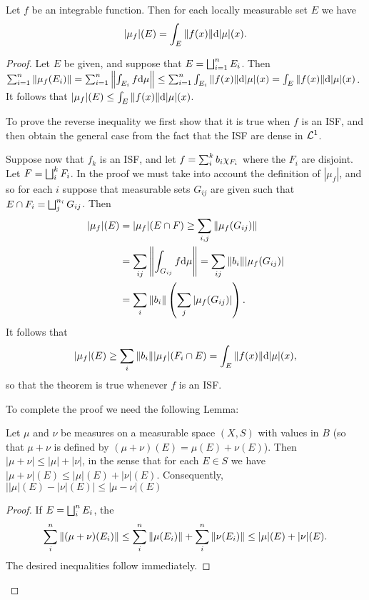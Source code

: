 \begin{proposition}
Let $f$ be an integrable function. Then for each locally measurable set $E$ we have $$|\mu_f|(E)=\int_E\norm{f(x)}\dd|\mu|(x).$$
\end{proposition}

\begin{proof}
Let $E$ be given, and suppose that $E=\bigsqcup_{i=1}^nE_i$. Then $\sum_{i=1}^n\norm{\mu_f(E_i)} = \sum_{i=1}^n\norm{\int_{E_i}f\dd\mu} \leq \sum_{i=1}^n\int_{E_i}\norm{f(x)}\dd|\mu|(x) = \allowbreak \int_E\norm{f(x)}\dd|\mu|(x)$. It follows that $|\mu_f|(E)\leq\int_E\norm{f(x)}\dd|\mu|(x)$.

To prove the reverse inequality we first show that it is true when $f$ is an ISF, and then obtain the general case from the fact that the ISF are dense in ${\cal L}^1$.

Suppose now that $f_k$ is an ISF, and let $f=\sum_i^kb_i\chi_{F_i}$ where the $F_i$ are disjoint. Let $F=\bigsqcup_i^kF_i$. In the proof we must take into account the definition of $|\mu_f|$, and so for each $i$ suppose that measurable sets $G_{ij}$ are given such that $E\cap F_i=\bigsqcup_j^{n_i}G_{ij}$. Then
\begin{align*}
    |\mu_f|(E)&=|\mu_f|(E\cap F)\geq\sum_{i,j}\norm{\mu_f(G_{ij})}\\
    &=\sum_{ij}\norm{\int_{G_{ij}}f\dd\mu}=\sum_{ij}\norm{b_i}|\mu_f(G_{ij})|\\
    &=\sum_i\norm{b_i}\left(\sum_j|\mu_f(G_{i j})|\right).
\end{align*}
It follows that $$|\mu_f|(E)\geq\sum_i\norm{b_i}|\mu_f|(F_i\cap E)=\int_E\norm{f(x)}\dd|\mu|(x),$$ so that the theorem is true whenever $f$ is an ISF.

To complete the proof we need the following Lemma:

\begin{lemma}
Let $\mu$ and $\nu$ be measures on a measurable space $(X,S)$ with values in $B$ (so that $\mu+\nu$ is defined by $(\mu+\nu)(E)=\mu(E)+\nu(E)$). Then $|\mu+\nu|\leq|\mu|+|\nu|$, in the sense that for each $E\in S$ we have $|\mu+\nu|(E)\leq|\mu|(E)+|\nu|(E)$. Consequently, $||\mu|(E)-|\nu|(E)|\leq|\mu-\nu|(E)$
\end{lemma}

\begin{proof}
If $E=\bigsqcup_i^nE_i$, the $$\sum_i^n\norm{(\mu+\nu)(E_i)}\leq\sum_i^n\norm{\mu(E_i)}+\sum_i^n\norm{\nu(E_i)}\leq|\mu|(E)+|\nu|(E).$$ The desired inequalities follow immediately.
\end{proof}


\end{proof}
